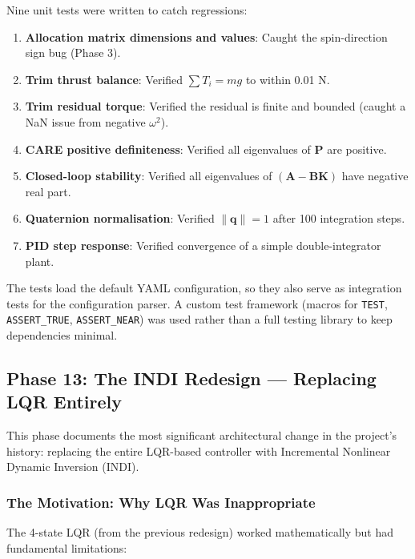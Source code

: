 \documentclass[12pt, a4paper]{article}
\newcommand{\bq}{\bm{q}}
\newcommand{\bK}{\bm{K}}
\newcommand{\bA}{\bm{A}}
\newcommand{\bB}{\bm{B}}
\newcommand{\bP}{\bm{P}}
\begin{document}
Nine unit tests were written to catch regressions:
\begin{enumerate}
    \item \textbf{Allocation matrix dimensions and values}: Caught the spin-direction sign bug (Phase 3).
    \item \textbf{Trim thrust balance}: Verified $\sum T_i = mg$ to within 0.01 N.
    \item \textbf{Trim residual torque}: Verified the residual is finite and bounded (caught a NaN issue from negative $\omega^2$).
    \item \textbf{CARE positive definiteness}: Verified all eigenvalues of $\bP$ are positive.
    \item \textbf{Closed-loop stability}: Verified all eigenvalues of $(\bA - \bB\bK)$ have negative real part.
    \item \textbf{Quaternion normalisation}: Verified $\|\bq\| = 1$ after 100 integration steps.
    \item \textbf{PID step response}: Verified convergence of a simple double-integrator plant.
\end{enumerate}

The tests load the default YAML configuration, so they also serve as integration tests for the configuration parser.  A custom test framework (macros for \texttt{TEST}, \texttt{ASSERT\_TRUE}, \texttt{ASSERT\_NEAR}) was used rather than a full testing library to keep dependencies minimal.

\subsection{Phase 13: The INDI Redesign --- Replacing LQR Entirely}

This phase documents the most significant architectural change in the project's history: replacing the entire LQR-based controller with Incremental Nonlinear Dynamic Inversion (INDI).

\subsubsection{The Motivation: Why LQR Was Inappropriate}

The 4-state LQR (from the previous redesign) worked mathematically but had fundamental limitations:
\end{document}
